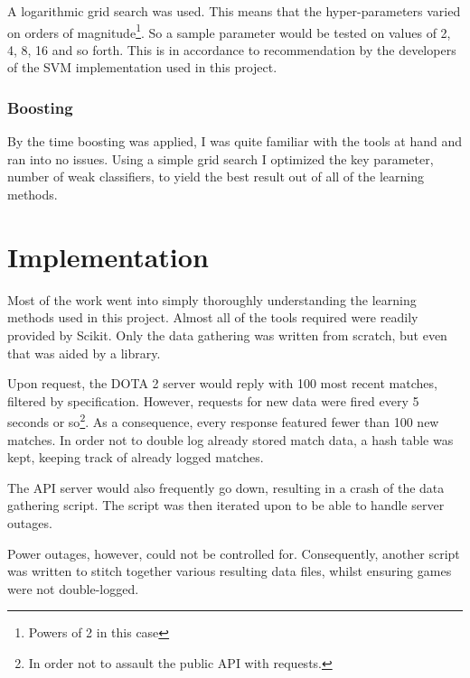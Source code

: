\documentclass[a4paper, 12pt]{article}
\begin{document}
                     \par A logarithmic grid search was used. This means that the hyper-parameters varied on orders of magnitude\footnote{Powers of 2 in this case}. So a sample parameter would be tested on values of 2, 4, 8, 16 and so forth. This is in accordance to recommendation by the developers of the SVM implementation used in this project\cite{svmGuide}.
                     
                \subsubsection{Boosting}
                    
                    \par By the time boosting was applied, I was quite familiar with the tools at hand and ran into no issues. Using a simple grid search I optimized the key parameter, number of weak classifiers, to yield the best result out of all of the learning methods.
                    
    \section{Implementation}
    
        \par Most of the work went into simply thoroughly understanding the learning methods used in this project. Almost all of the tools required were readily provided by Scikit\cite{sklearn}. Only the data gathering was written from scratch, but even that was aided by a library\cite{pythonAPI}.
        
        \par Upon request, the DOTA 2 server would reply with 100 most recent matches, filtered by specification. However, requests for new data were fired every 5 seconds or so\footnote{In order not to assault the public API with requests.}. As a consequence, every response featured fewer than 100 new matches. In order not to double log already stored match data, a hash table was kept, keeping track of already logged matches.
        
        \par The API server would also frequently go down, resulting in a crash of the data gathering script. The script was then iterated upon to be able to handle server outages.
        
        \par Power outages, however, could not be controlled for. Consequently, another script was written to stitch together various resulting data files, whilst ensuring games were not double-logged.
        
\end{document}
